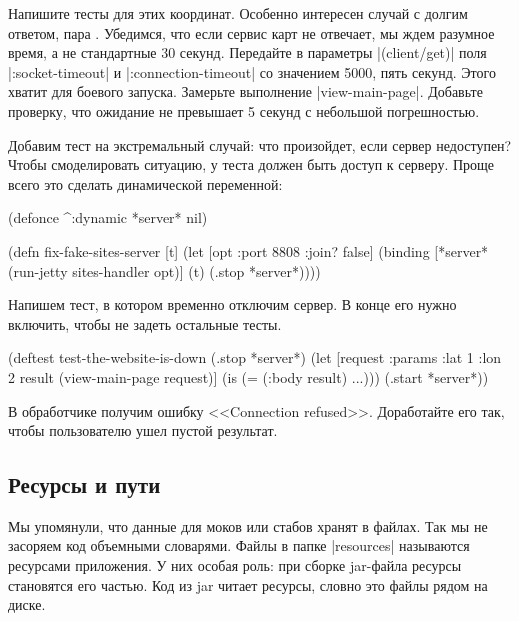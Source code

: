 Напишите тесты для этих координат. Особенно интересен случай с долгим ответом,
пара . Убедимся, что если сервис карт не отвечает, мы ждем разумное
время, а не стандартные 30 секунд. Передайте в параметры \spverb|(client/get)|
поля \spverb|:socket-timeout| и \spverb|:connection-timeout| со значением 5000,
пять секунд. Этого хватит для боевого запуска. Замерьте выполнение
\spverb|view-main-page|. Добавьте проверку, что ожидание не превышает 5 секунд с
небольшой погрешностью.

Добавим тест на экстремальный случай: что произойдет, если сервер недоступен?
Чтобы смоделировать ситуацию, у теста должен быть доступ к серверу. Проще всего
это сделать динамической переменной:

\begin{english}
  \begin{clojure}
(defonce ^:dynamic *server* nil)

(defn fix-fake-sites-server [t]
  (let [opt {:port 8808 :join? false}]
    (binding [*server* (run-jetty sites-handler opt)]
      (t)
      (.stop *server*))))
  \end{clojure}
\end{english}

Напишем тест, в котором временно отключим сервер. В конце его нужно включить,
чтобы не задеть остальные тесты.

\begin{english}
  \begin{clojure}
(deftest test-the-website-is-down
  (.stop *server*)
  (let [request {:params {:lat 1 :lon 2}}
        result (view-main-page request)]
    (is (= (:body result) {...})))
  (.start *server*))
  \end{clojure}
\end{english}

В обработчике получим ошибку <<Connection refused>>. Доработайте его так, чтобы
пользователю ушел пустой результат.

\subsection{Ресурсы и пути}

Мы упомянули, что данные для моков или стабов хранят в файлах. Так мы не
засоряем код объемными словарями. Файлы в папке \spverb|resources| называются
ресурсами приложения. У них особая роль: при сборке jar-файла ресурсы становятся
его частью. Код из jar читает ресурсы, словно это файлы рядом на диске.

